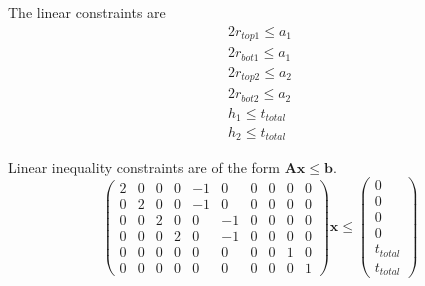 \documentclass[12pt]{article}
\numberwithin{equation}{section}
\numberwithin{equation}{section}
\begin{document}
\begin{outline}[enumerate]
The linear constraints are 
\begin{align*} 
2 r_{top1} \leq a_1 \\
2 r_{bot1} \leq a_1\\
2 r_{top2} \leq a_2\\
2 r_{bot2} \leq a_2 \\
h_1 \leq t_{total} \\
h_2 \leq t_{total}
\end{align*}

Linear inequality constraints are of the form $\mathbf{A} \mathbf{x} \leq \mathbf{b}$.
\setcounter{MaxMatrixCols}{20}
\begin{equation}
\left(
\begin{matrix}
2 & 0 & 0 & 0 & -1 & 0 & 0 & 0 & 0 & 0 \\
0 & 2 & 0 & 0 & -1 & 0 & 0 & 0 & 0 & 0 \\
0 & 0 & 2 & 0 & 0 & -1 & 0 & 0 & 0 & 0 \\
0 & 0 & 0 & 2 & 0 & -1 & 0 & 0 & 0 & 0 \\
0 & 0 & 0 & 0 & 0 & 0 & 0 & 0 & 1 & 0  \\
0 & 0 & 0 & 0 & 0 & 0 & 0 & 0 & 0 & 1  
\end{matrix}
\right ) \mathbf{x}  \leq \left ( \begin{matrix} 0\\ 0\\ 0\\ 0 \\t_{total} \\t_{total}  \end{matrix} \right ) 
\end{equation}


\end{outline}
\end{document}

